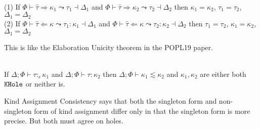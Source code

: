 \documentclass[12pt,letterpaper]{article}
\newcommand{\elabAna}[6]{#1 \vdash #2 \Leftarrow #3 \leadsto #4 : #5 \dashv #6}
\newcommand{\elabSyn}[5]{#1 \vdash #2 \Rightarrow #3 \leadsto #4 \dashv #5}
\newcommand{\kconsubkind}[3]{#1 \vdash #2 \lesssim #3}
\newcommand{\kindAssign}[3]{#1 \vdash #2 : #3}
\newcommand{\kindAssignS}[3]{#1 \vdash #2 :_s #3}
\newcommand{\hPhi}{\Phi}
\newcommand{\htau}{\hat{\tau}}
\newcommand{\hkappa}{\kappa}
\newcommand{\dtau}{\tau}
\newcommand{\KHole}{\textt{KHole}}
\begin{document}
\begin{thm}\ \\
	(1) If $\elabSyn{\hPhi}{\htau}{\hkappa_1}{\dtau_1}{\Delta_1}$ and $\elabSyn{\hPhi}{\htau}{\hkappa_2}{\dtau_2}{\Delta_2}$ then $\hkappa_1 = \hkappa_2$, $\dtau_1 = \dtau_2$, $\Delta_1 = \Delta_2$ \\
	(2) If $\elabAna{\hPhi}{\htau}{\hkappa}{\dtau_1}{\hkappa_1}{\Delta_1}$ and $\elabAna{\hPhi}{\htau}{\hkappa}{\dtau_2}{\hkappa_2}{\Delta_2}$ then $\dtau_1 = \dtau_2$, $\hkappa_1 = \hkappa_2$, $\Delta_1 = \Delta_2$
\end{thm}
\noindent
This is like the Elaboration Unicity theorem in the POPL19 paper.



\begin{thm}\ \\
	If $\kindAssignS{\Delta;\hPhi}{\dtau}{\hkappa_1}$ and $\kindAssign{\Delta;\hPhi}{\dtau}{\hkappa_2}$ then $\kconsubkind{\Delta;\hPhi}{\hkappa_1}{\hkappa_2}$ and $\hkappa_1,\hkappa_2$ are either both $\KHole$ or neither is.
\end{thm}

\noindent
Kind Assignment Consistency says that both the singleton form and non-singleton form of kind assignment differ only in that the singleton form is more precise. But both must agree on holes.
\end{document}
